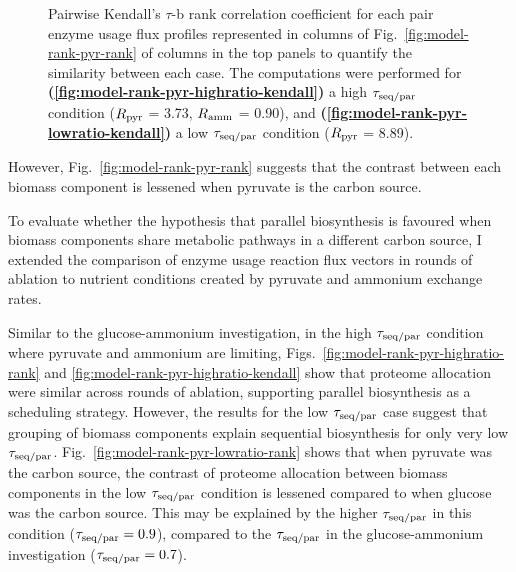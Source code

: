 \begin{figure}
  \caption{
    Pairwise Kendall's $\tau$-b rank correlation coefficient \parencite{kendallTREATMENTTIESRANKING1945} for each pair enzyme usage flux profiles represented in columns of Fig.\ \ref{fig:model-rank-pyr-rank} of columns in the top panels to quantify the similarity between each case.
    The computations were performed for \textbf{(\ref{fig:model-rank-pyr-highratio-kendall})} a high $\tau_{\mathrm{seq}/\mathrm{par}}$ condition ($R_{\mathrm{pyr}}$ = \SI{3.73}{\mmolgdwh}, $R_{\mathrm{amm}}$ = \SI{0.90}{\mmolgdwh}), and \textbf{(\ref{fig:model-rank-pyr-lowratio-kendall})} a low $\tau_{\mathrm{seq}/\mathrm{par}}$ condition ($R_{\mathrm{pyr}}$ = \SI{8.89}{\mmolgdwh}).
  }
  \label{fig:model-rank-pyr-kendall}
\end{figure}

However, Fig.\ \ref{fig:model-rank-pyr-rank} suggests that the contrast between each biomass component is lessened when pyruvate is the carbon source.

To evaluate whether the hypothesis that parallel biosynthesis is favoured when biomass components share metabolic pathways in a different carbon source, I extended the comparison of enzyme usage reaction flux vectors in rounds of ablation to nutrient conditions created by pyruvate and ammonium exchange rates.

Similar to the glucose-ammonium investigation, in the high $\tau_{\mathrm{seq}/\mathrm{par}}$ condition where pyruvate and ammonium are limiting, Figs.\ \ref{fig:model-rank-pyr-highratio-rank} and \ref{fig:model-rank-pyr-highratio-kendall} show that proteome allocation were similar across rounds of ablation, supporting parallel biosynthesis as a scheduling strategy.
However, the results for the low $\tau_{\mathrm{seq}/\mathrm{par}}$ case suggest that grouping of biomass components explain sequential biosynthesis for only very low $\tau_{\mathrm{seq}/\mathrm{par}}$.
Fig.\ \ref{fig:model-rank-pyr-lowratio-rank} shows that when pyruvate was the carbon source, the contrast of proteome allocation between biomass components in the low $\tau_{\mathrm{seq}/\mathrm{par}}$ condition is lessened compared to when glucose was the carbon source.
This may be explained by the higher $\tau_{\mathrm{seq}/\mathrm{par}}$ in this condition ($\tau_{\mathrm{seq}/\mathrm{par}} = 0.9$), compared to the $\tau_{\mathrm{seq}/\mathrm{par}}$ in the glucose-ammonium investigation ($\tau_{\mathrm{seq}/\mathrm{par}} = 0.7$).

